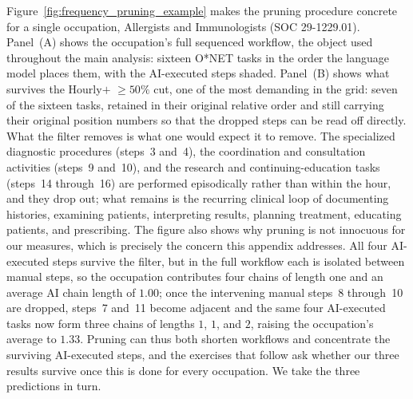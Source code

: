 Figure~\ref{fig:frequency_pruning_example} makes the pruning procedure concrete for a single occupation, Allergists and Immunologists (SOC 29-1229.01).
Panel~(A) shows the occupation's full sequenced workflow, the object used throughout the main analysis: sixteen O*NET tasks in the order the language model places them, with the AI-executed steps shaded.
Panel~(B) shows what survives the Hourly$+$ $\geq 50\%$ cut, one of the most demanding in the grid: seven of the sixteen tasks, retained in their original relative order and still carrying their original position numbers so that the dropped steps can be read off directly.
What the filter removes is what one would expect it to remove.
The specialized diagnostic procedures (steps~3 and~4), the coordination and consultation activities (steps~9 and~10), and the research and continuing-education tasks (steps~14 through~16) are performed episodically rather than within the hour, and they drop out; what remains is the recurring clinical loop of documenting histories, examining patients, interpreting results, planning treatment, educating patients, and prescribing.
The figure also shows why pruning is not innocuous for our measures, which is precisely the concern this appendix addresses.
All four AI-executed steps survive the filter, but in the full workflow each is isolated between manual steps, so the occupation contributes four chains of length one and an average AI chain length of $1.00$; once the intervening manual steps~8 through~10 are dropped, steps~7 and~11 become adjacent and the same four AI-executed tasks now form three chains of lengths $1$, $1$, and $2$, raising the occupation's average to $1.33$.
Pruning can thus both shorten workflows and concentrate the surviving AI-executed steps, and the exercises that follow ask whether our three results survive once this is done for every occupation.
We take the three predictions in turn.

